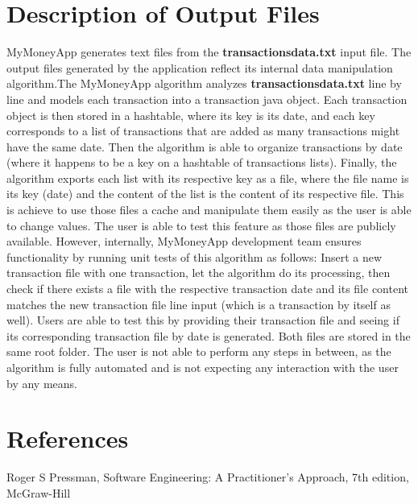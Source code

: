 \documentclass{article}
\begin{document}
\section{Description of Output Files}

MyMoneyApp generates text files from the \textbf{transactions\textunderscore data.txt} input file. The output files generated by the application reflect its internal data manipulation algorithm.\newline The MyMoneyApp algorithm analyzes \textbf{transactions\textunderscore data.txt} line by line and models each transaction into a transaction java object. Each transaction object is then stored in a hashtable, where its key is its date, and each key corresponds to a list of transactions that are added as many transactions might have the same date. Then the algorithm is able to organize transactions by date (where it happens to be a key on a hashtable of transactions lists). Finally, the algorithm exports each list with its respective key as a file, where the file name is its key (date) and the content of the list is the content of its respective file. This is achieve to use those files a cache and manipulate them easily as the user is able to change values.
\newline\newline The user is able to test this feature as those files are publicly available. However, internally, MyMoneyApp development team ensures functionality by running unit tests of this algorithm as follows: Insert a new transaction file with one transaction, let the algorithm do its processing, then check if there exists a file with the respective transaction date and its file content matches the new transaction file line input (which is a transaction by itself as well). \newline Users are able to test this by providing their transaction file and seeing if its corresponding transaction file by date is generated. Both files are stored in the same root folder. The user is not able to perform any steps in between, as the algorithm is fully automated and is not expecting any interaction with the user by any means.

\clearpage

\section{References}
Roger S Pressman, Software Engineering: A Practitioner's Approach, 7th edition, McGraw-Hill

\appendix
\clearpage

\listoftables
\end{document}
